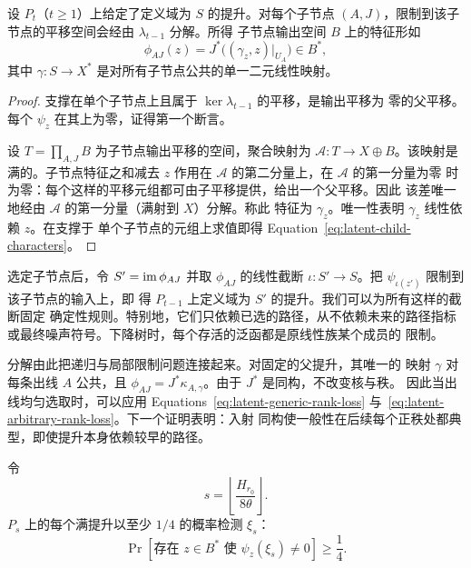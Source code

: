 \begin{lemma}\label{lem:latent-lift-factorization}
设 $P_t$（$t\ge1$）上给定了定义域为 $S$ 的提升。对每个子节点
$(A,J)$，限制到该子节点的平移空间会经由 $\lambda_{t-1}$ 分解。所得
子节点输出空间 $B$ 上的特征形如
\begin{equation}\label{eq:latent-child-characters}
 \phi_{AJ}(z)=J^*\bigl((\gamma_z,z)|_{U_A}\bigr)\in B^*,
\end{equation}
其中 $\gamma:S\to X^*$ 是对所有子节点公共的单一二元线性映射。
\end{lemma}

\begin{proof}
支撑在单个子节点上且属于 $\ker\lambda_{t-1}$ 的平移，是输出平移为
零的父平移。每个 $\psi_z$ 在其上为零，证得第一个断言。

设 $T=\prod_{A,J}B$ 为子节点输出平移的空间，聚合映射为
$\mathcal A:T\to X\oplus B$。该映射是满的。子节点特征之和减去 $z$
作用在 $\mathcal A$ 的第二分量上，在 $\mathcal A$ 的第一分量为零
时为零：每个这样的平移元组都可由子平移提供，给出一个父平移。因此
该差唯一地经由 $\mathcal A$ 的第一分量（满射到 $X$）分解。称此
特征为 $\gamma_z$。唯一性表明 $\gamma_z$ 线性依赖 $z$。在支撑于
单个子节点的元组上求值即得 Equation~\eqref{eq:latent-child-characters}。
\end{proof}

选定子节点后，令 $S'=\operatorname{im}\phi_{AJ}$ 并取 $\phi_{AJ}$ 的线性截断
$\iota:S'\to S$。把 $\psi_{\iota(z')}$ 限制到该子节点的输入上，即
得 $P_{t-1}$ 上定义域为 $S'$ 的提升。我们可以为所有这样的截断固定
确定性规则。特别地，它们只依赖已选的路径，从不依赖未来的路径指标
或最终噪声符号。下降树时，每个存活的泛函都是原线性族某个成员的
限制。

分解由此把递归与局部限制问题连接起来。对固定的父提升，其唯一的
映射 $\gamma$ 对每条出线 $A$ 公共，且
$\phi_{AJ}=J^*\kappa_{A,\gamma}$。由于 $J^*$ 是同构，不改变核与秩。
因此当出线均匀选取时，可以应用
Equations~\eqref{eq:latent-generic-rank-loss}
与~\eqref{eq:latent-arbitrary-rank-loss}。下一个证明表明：入射
同构使一般性在后续每个正秩处都典型，即使提升本身依赖较早的路径。

\begin{proposition}\label{prop:latent-full-lift-detection}
令
\begin{equation}\label{eq:latent-depth}
 s=\left\lfloor\frac{H_{r_0}}{8\theta}\right\rfloor.
\end{equation}
$P_s$ 上的每个满提升以至少 $1/4$ 的概率检测 $\xi_s$：
\begin{equation}\label{eq:latent-full-lift-detection}
 \Pr[\text{存在 }z\in B^*\text{ 使 }\psi_z(\xi_s)\ne0]
 \ge\frac14.
\end{equation}
\end{proposition}

